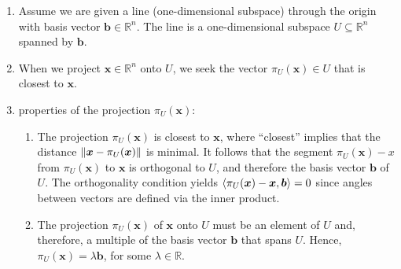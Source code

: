 \begin{enumerate}
    \item Assume we are given a line (one-dimensional subspace) through the origin with basis vector $\bm{b} \in \mathbb{R}^n$.
    The line is a one-dimensional subspace $U \subseteq \mathbb{R}^n$ spanned by $\bm{b}$. 
    \hfill \cite{mfml/book/mml/Deisenroth-Faisal-Ong}

    \item When we project $\bm{x} \in \mathbb{R}^n$ onto $U$, we seek the vector $\pi_U (\bm{x}) \in U$ that is closest to $\bm{x}$.
    \hfill \cite{mfml/book/mml/Deisenroth-Faisal-Ong}

    \item properties of the projection $\pi_U (\bm{x})$:
    \begin{enumerate}
        \item The projection $\pi _U (\bm{x})$ is closest to $\bm{x}$, where “closest” implies that the distance $\left\| \bm{x} - \pi _U (\bm{x}) \right\|$ is minimal. 
        It follows that the segment $\pi _U (\bm{x}) - x$ from $\pi _U (\bm{x})$ to $\bm{x}$ is orthogonal to $U$, and therefore the basis vector $\bm{b}$ of $U$. 
        The orthogonality condition yields $\langle\pi _U (\bm{x})  -  \bm{x}, \bm{b}\rangle = 0$ since angles between vectors are defined via the inner product.
        \hfill \cite{mfml/book/mml/Deisenroth-Faisal-Ong}

        \item The projection $\pi_U (\bm{x})$ of $\bm{x}$ onto $U$ must be an element of $U$ and, therefore, a multiple of the basis vector $\bm{b}$ that spans $U$. 
        Hence, $\pi_U (\bm{x}) = \lambda\bm{b}$, for some $\lambda \in \mathbb{R}$.
        \hfill \cite{mfml/book/mml/Deisenroth-Faisal-Ong}
    \end{enumerate}


\end{enumerate}

